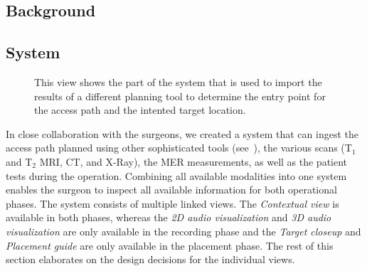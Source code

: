 \subsection{Background} \label{contributions:dbs:background}


\subsection{System} \label{contributions:dbs:system}
\begin{figure}
\caption{This view shows the part of the system that is used to import the results of a different planning tool to determine the entry point for the access path and the intented target location.}
\label{contributions:medbio:dbs:planning}
\end{figure}

In close collaboration with the surgeons, we created a system that can ingest the access path planned using other sophisticated tools (see~), the various scans (T$_1$ and T$_2$ MRI, CT, and X-Ray), the MER measurements, as well as the patient tests during the operation. Combining all available modalities into one system enables the surgeon to inspect all available information for both operational phases. The system consists of multiple linked views. The \emph{Contextual view} is available in both phases, whereas the \emph{2D audio visualization} and \emph{3D audio visualization} are only available in the recording phase and the \emph{Target closeup} and \emph{Placement guide} are only available in the placement phase. The rest of this section elaborates on the design decisions for the individual views.

